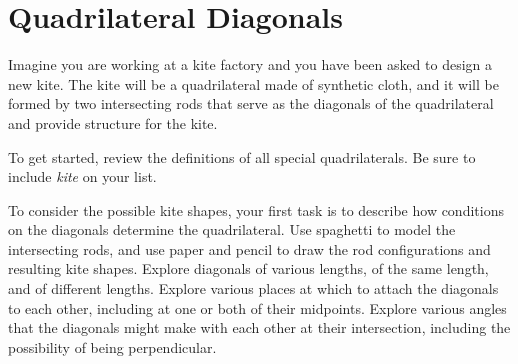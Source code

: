 \newpage

\section{Quadrilateral Diagonals}

Imagine you are working at a kite factory and you have been asked to design a new kite.  The kite will be a quadrilateral made of synthetic cloth, and it will be formed by two intersecting rods that serve as the diagonals of the quadrilateral and provide structure for the kite.  

\begin{prob}
To get started, review the definitions of all special quadrilaterals.  Be sure to include \emph{kite} on your list.  
\end{prob}

\begin{prob}
To consider the possible kite shapes, your first task is to describe how conditions on the diagonals determine the quadrilateral.  Use spaghetti to model the intersecting rods, and use paper and pencil to draw the rod configurations and resulting kite shapes.   Explore diagonals of various lengths, of the same length, and of different lengths.  Explore various places at which to attach the diagonals to each other, including at one or both of their midpoints.  Explore various angles that the diagonals might make with each other at their intersection, including the possibility of being perpendicular.  
\end{prob}

